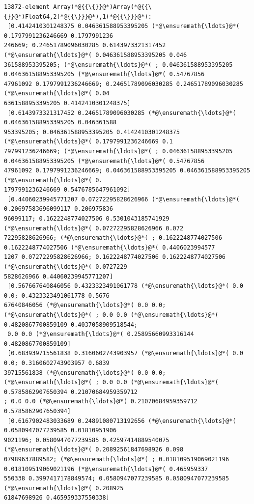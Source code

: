 \documentclass[12pt,a4paper]{article}
\begin{document}
\begin{lstlisting}
13872-element Array(*@{{\{}}@*)Array(*@{{\{}}@*)Float64,2(*@{{\}}}@*),1(*@{{\}}}@*):
 [0.4142410301248375 0.046361588953395205 (*@\ensuremath{\ldots}@*( 0.1797991236246669 0.1797991236
246669; 0.24651789096030285 0.6143973321317452 (*@\ensuremath{\ldots}@*( 0.046361588953395205 0.046
361588953395205; (*@\ensuremath{\ldots}@*( ; 0.046361588953395205 0.046361588953395205 (*@\ensuremath{\ldots}@*( 0.54767856
47961092 0.1797991236246669; 0.24651789096030285 0.24651789096030285 (*@\ensuremath{\ldots}@*( 0.04
6361588953395205 0.4142410301248375]
 [0.6143973321317452 0.24651789096030285 (*@\ensuremath{\ldots}@*( 0.046361588953395205 0.046361588
953395205; 0.046361588953395205 0.4142410301248375 (*@\ensuremath{\ldots}@*( 0.1797991236246669 0.1
797991236246669; (*@\ensuremath{\ldots}@*( ; 0.046361588953395205 0.046361588953395205 (*@\ensuremath{\ldots}@*( 0.54767856
47961092 0.1797991236246669; 0.046361588953395205 0.046361588953395205 (*@\ensuremath{\ldots}@*( 0.
1797991236246669 0.5476785647961092]
 [0.44060239945771207 0.07272295828626966 (*@\ensuremath{\ldots}@*( 0.20697583696099117 0.206975836
96099117; 0.1622248774027506 0.5301043185741929 (*@\ensuremath{\ldots}@*( 0.07272295828626966 0.072
72295828626966; (*@\ensuremath{\ldots}@*( ; 0.1622248774027506 0.1622248774027506 (*@\ensuremath{\ldots}@*( 0.4406023994577
1207 0.07272295828626966; 0.1622248774027506 0.1622248774027506 (*@\ensuremath{\ldots}@*( 0.0727229
5828626966 0.44060239945771207]
 [0.567667640846056 0.4323323491061778 (*@\ensuremath{\ldots}@*( 0.0 0.0; 0.4323323491061778 0.5676
67640846056 (*@\ensuremath{\ldots}@*( 0.0 0.0; (*@\ensuremath{\ldots}@*( ; 0.0 0.0 (*@\ensuremath{\ldots}@*( 0.4820867700859109 0.4037058909518544;
 0.0 0.0 (*@\ensuremath{\ldots}@*( 0.25895660993316144 0.4820867700859109]
 [0.683939715561838 0.3160602743903957 (*@\ensuremath{\ldots}@*( 0.0 0.0; 0.3160602743903957 0.6839
39715561838 (*@\ensuremath{\ldots}@*( 0.0 0.0; (*@\ensuremath{\ldots}@*( ; 0.0 0.0 (*@\ensuremath{\ldots}@*( 0.5785862907650394 0.21070684959359712
; 0.0 0.0 (*@\ensuremath{\ldots}@*( 0.21070684959359712 0.5785862907650394]
 [0.6167902483033689 0.24891080713192656 (*@\ensuremath{\ldots}@*( 0.0580947077239585 0.01810951906
9021196; 0.0580947077239585 0.42597414889540075 (*@\ensuremath{\ldots}@*( 0.20892561847698926 0.098
07989637889582; (*@\ensuremath{\ldots}@*( ; 0.018109519069021196 0.018109519069021196 (*@\ensuremath{\ldots}@*( 0.465959337
550338 0.3997417178849574; 0.0580947077239585 0.0580947077239585 (*@\ensuremath{\ldots}@*( 0.208925
61847698926 0.465959337550338]

\end{lstlisting}
\end{document}
